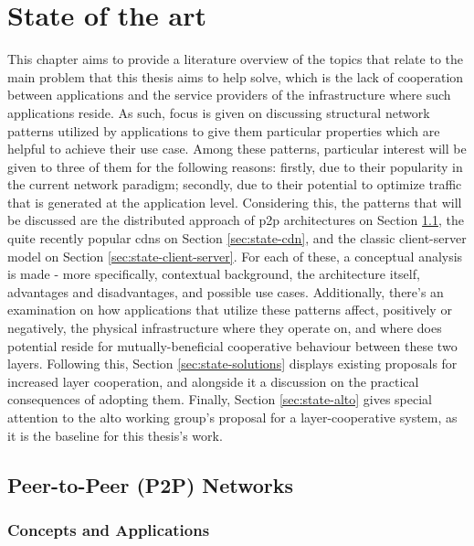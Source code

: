 \chapter{State of the art}

\label{sec:state-of-art}


    This chapter aims to provide a literature overview of the topics that relate to the main problem that this thesis aims to help solve, which is the lack of cooperation between applications and the service providers of the infrastructure where such applications reside.
    As such, focus is given on discussing structural network patterns utilized by applications to give them particular properties which are helpful to achieve their use case.
    Among these patterns, particular interest will be given to three of them for the following reasons: firstly, due to their popularity in the current network paradigm; secondly, due to their potential to optimize traffic that is generated at the application level.
    Considering this, the patterns that will be discussed are the distributed approach of \gls{p2p} architectures on Section \ref{sec:state-p2p}, the quite recently popular \glspl{cdn} on Section \ref{sec:state-cdn}, and the classic client-server model on Section \ref{sec:state-client-server}.
    For each of these, a conceptual analysis is made - more specifically, contextual background, the architecture itself, advantages and disadvantages, and possible use cases.
    Additionally, there's an examination on how applications that utilize these patterns affect, positively or negatively, the physical infrastructure where they operate on, and where does potential reside for mutually-beneficial cooperative behaviour between these two layers.
    Following this, Section \ref{sec:state-solutions} displays existing proposals for increased layer cooperation, and alongside it a discussion on the practical consequences of adopting them.
    Finally, Section \ref{sec:state-alto} gives special attention to the \gls{alto} working group's proposal for a layer-cooperative system, as it is the baseline for this thesis's work.

\section{Peer-to-Peer (P2P) Networks}

\label{sec:state-p2p}

\subsection{Concepts and Applications}

